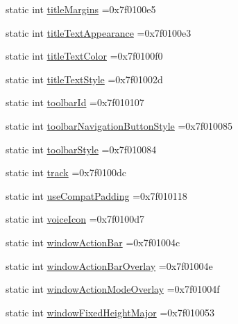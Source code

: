 \begin{DoxyCompactItemize}
\item 
static int \hyperlink{classandroid_1_1support_1_1v7_1_1appcompat_1_1R_1_1attr_ad8d424270f154ae84996d3d49a832ee6}{title\+Margins} =0x7f0100e5
\item 
static int \hyperlink{classandroid_1_1support_1_1v7_1_1appcompat_1_1R_1_1attr_a1025276e3fbb799cf954a6774ad2ec97}{title\+Text\+Appearance} =0x7f0100e3
\item 
static int \hyperlink{classandroid_1_1support_1_1v7_1_1appcompat_1_1R_1_1attr_a597dc103e0e2288dfc7bd92d961bc837}{title\+Text\+Color} =0x7f0100f0
\item 
static int \hyperlink{classandroid_1_1support_1_1v7_1_1appcompat_1_1R_1_1attr_a736fcf06e75745b6eb862450e360d947}{title\+Text\+Style} =0x7f01002d
\item 
static int \hyperlink{classandroid_1_1support_1_1v7_1_1appcompat_1_1R_1_1attr_a4105f4e74aea7a62a41e49f62c057c62}{toolbar\+Id} =0x7f010107
\item 
static int \hyperlink{classandroid_1_1support_1_1v7_1_1appcompat_1_1R_1_1attr_ae7c3c73d23efd4eedd165383feacbf68}{toolbar\+Navigation\+Button\+Style} =0x7f010085
\item 
static int \hyperlink{classandroid_1_1support_1_1v7_1_1appcompat_1_1R_1_1attr_af5896838850b900b5fc76c6bbda40f7f}{toolbar\+Style} =0x7f010084
\item 
static int \hyperlink{classandroid_1_1support_1_1v7_1_1appcompat_1_1R_1_1attr_a8d34459bf1b56730d9db07c0105fef49}{track} =0x7f0100dc
\item 
static int \hyperlink{classandroid_1_1support_1_1v7_1_1appcompat_1_1R_1_1attr_a41d5d117864ce88df8ccd7fb51d7f54d}{use\+Compat\+Padding} =0x7f010118
\item 
static int \hyperlink{classandroid_1_1support_1_1v7_1_1appcompat_1_1R_1_1attr_ad6aa346699af6c2cc1b3a74ac7e59f41}{voice\+Icon} =0x7f0100d7
\item 
static int \hyperlink{classandroid_1_1support_1_1v7_1_1appcompat_1_1R_1_1attr_ad4cb7154b0f22de4c1ea343bc2999284}{window\+Action\+Bar} =0x7f01004c
\item 
static int \hyperlink{classandroid_1_1support_1_1v7_1_1appcompat_1_1R_1_1attr_a1b21b31c31a8d3a7cef82b24287132a3}{window\+Action\+Bar\+Overlay} =0x7f01004e
\item 
static int \hyperlink{classandroid_1_1support_1_1v7_1_1appcompat_1_1R_1_1attr_ac8444ac2d86dbdcb89e0cb5cb2a83541}{window\+Action\+Mode\+Overlay} =0x7f01004f
\item 
static int \hyperlink{classandroid_1_1support_1_1v7_1_1appcompat_1_1R_1_1attr_a568ba891a04bf2c4a15c2ead6fbea181}{window\+Fixed\+Height\+Major} =0x7f010053

\end{DoxyCompactItemize}
